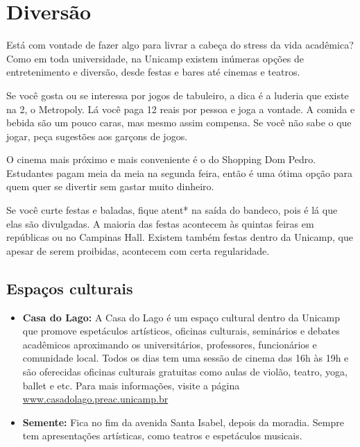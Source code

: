 
\section{Diversão}
Está com vontade de fazer algo para livrar a cabeça do stress da vida acadêmica?
Como em toda universidade, na Unicamp existem inúmeras opções de entretenimento
e diversão, desde festas e bares até cinemas e teatros.

Se você gosta ou se interessa por jogos de tabuleiro, a dica é a luderia que
existe na 2, o Metropoly. Lá você paga 12 reais por pessoa e joga a vontade. A
comida e bebida são um pouco caras, mas mesmo assim compensa. Se você não sabe o
que jogar, peça sugestões aos garçons de jogos.

O cinema mais próximo e mais conveniente é o do Shopping Dom Pedro. Estudantes
pagam meia da meia na segunda feira, então é uma ótima opção para quem quer se
divertir sem gastar muito dinheiro.

Se você curte festas e baladas, fique atent* na saída do bandeco, pois é lá que
elas são divulgadas. A maioria das festas acontecem às quintas feiras em
repúblicas ou no Campinas Hall. Existem também festas dentro da Unicamp, que
apesar de serem proibidas, acontecem com certa regularidade.

\subsection{Espaços culturais}

\begin{itemize}
    \item   \textbf{Casa do Lago:} A Casa do Lago é um espaço cultural dentro 
    	da Unicamp que promove espetáculos artísticos, oficinas culturais, 
	seminários e debates acadêmicos aproximando os universitários, 
	professores, funcionários e comunidade local. Todos os dias tem uma 
	sessão de cinema das 16h às 19h e são oferecidas oficinas culturais 
	gratuitas como aulas de violão, teatro, yoga, ballet e etc. Para mais 
	informações, visite a página \url{www.casadolago.preac.unicamp.br}


    \item   \textbf{Semente:} Fica no fim da avenida Santa Isabel, depois da
        moradia. Sempre tem apresentações artísticas, como teatros e espetáculos
        musicais.
\end{itemize}


